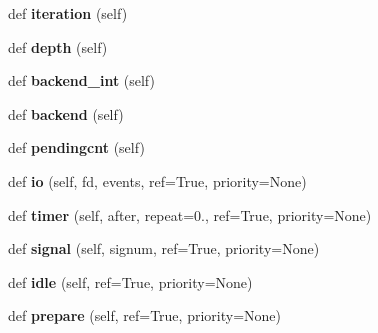 \begin{DoxyCompactItemize}
def {\bfseries iteration} (self)
\item 
\mbox{\label{classgevent_1_1__ffi_1_1loop_1_1_abstract_loop_ab3d198cf97592e41a56f629e9d387e18}} 
def {\bfseries depth} (self)
\item 
\mbox{\label{classgevent_1_1__ffi_1_1loop_1_1_abstract_loop_af29e34aa2d5145a1a6765b13b180c6f2}} 
def {\bfseries backend\+\_\+int} (self)
\item 
\mbox{\label{classgevent_1_1__ffi_1_1loop_1_1_abstract_loop_a4b254c971f4c82bd0eef69ed318eacac}} 
def {\bfseries backend} (self)
\item 
\mbox{\label{classgevent_1_1__ffi_1_1loop_1_1_abstract_loop_adff8a59980c04e1ca72348fbcb878f82}} 
def {\bfseries pendingcnt} (self)
\item 
\mbox{\label{classgevent_1_1__ffi_1_1loop_1_1_abstract_loop_ae405d0911383cf43ef84b8dd9261df46}} 
def {\bfseries io} (self, fd, events, ref=True, priority=None)
\item 
\mbox{\label{classgevent_1_1__ffi_1_1loop_1_1_abstract_loop_ab24034a5570b3803d308bb1a7973a7cd}} 
def {\bfseries timer} (self, after, repeat=0., ref=True, priority=None)
\item 
\mbox{\label{classgevent_1_1__ffi_1_1loop_1_1_abstract_loop_aee9eddd3f2720d4fc1499340c9924f27}} 
def {\bfseries signal} (self, signum, ref=True, priority=None)
\item 
\mbox{\label{classgevent_1_1__ffi_1_1loop_1_1_abstract_loop_a458644b17f99514c19f5be105e632894}} 
def {\bfseries idle} (self, ref=True, priority=None)
\item 
\mbox{\label{classgevent_1_1__ffi_1_1loop_1_1_abstract_loop_a861d0a2eeece64e1cff32ca91e8fd61d}} 
def {\bfseries prepare} (self, ref=True, priority=None)

\end{DoxyCompactItemize}
